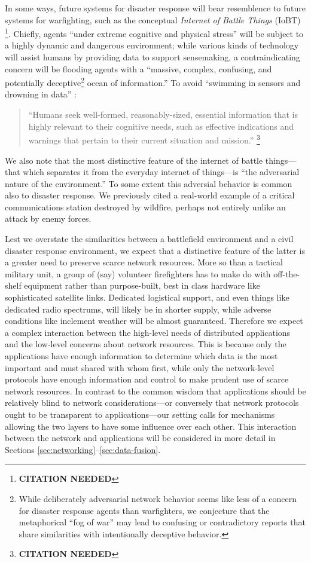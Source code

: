 \documentclass[]             %
{NASA}                       %
\theoremstyle{definition}
\newcommand{\citationneeded}{\footnote{\textbf{CITATION NEEDED}}}
\begin{document}
In some ways, future systems for disaster response will bear
resemblence to future systems for warfighting, such as the conceptual
\emph{Internet of Battle Things} (IoBT) \citationneeded. Chiefly,
agents ``under extreme cognitive and physical stress'' will be subject
to a highly dynamic and dangerous environment; while various kinds of
technology will assist humans by providing data to support
sensemaking, a contraindicating concern will be flooding agents with a
``massive, complex, confusing, and potentially
deceptive\footnote{While deliberately adversarial network behavior
seems like less of a concern for disaster response agents than
warfighters, we conjecture that the metaphorical ``fog of war'' may
lead to confusing or contradictory reports that share similarities
with intentionally deceptive behavior.} ocean of information.'' To
avoid ``swimming in sensors and drowning in data''
\cite{2010:magnuson}:
\begin{quote}
``Humans seek well-formed, reasonably-sized, essential information
  that is highly relevant to their cognitive needs, such as effective
  indications and warnings that pertain to their current situation and
  mission.'' \citationneeded
\end{quote}
We also note that the most distinctive feature of the internet of
battle things---that which separates it from the everyday internet of
things---is ``the adversarial nature of the environment.'' To some
extent this adversial behavior is common also to disaster response. We
previously cited a real-world example of a critical communications
station destroyed by wildfire, perhaps not entirely unlike an attack
by enemy forces.

Lest we overstate the similarities between a battlefield environment
and a civil disaster response environment, we expect that a
distinctive feature of the latter is a greater need to preserve scarce
network resources. More so than a tactical military unit, a group of
(say) volunteer firefighters has to make do with off-the-shelf
equipment rather than purpose-built, best in class hardware like
sophisticated satellite links. Dedicated logistical support, and even
things like dedicated radio spectrums, will likely be in shorter
supply, while adverse conditions like inclement weather will be almost
guaranteed. Therefore we expect a complex interaction between the
high-level needs of distributed applications and the low-level
concerns about network resources. This is because only the
applications have enough information to determine which data is the
most important and must shared with whom first, while only the
network-level protocols have enough information and control to make
prudent use of scarce network resources. In contrast to the common
wisdom that applications should be relatively blind to network
considerations---or conversely that network protocols ought to be
transparent to applications---our setting calls for mechanisms
allowing the two layers to have some influence over each other. This
interaction between the network and applications will be considered in
more detail in Sections \ref{sec:networking}--\ref{sec:data-fusion}.
\end{document}
